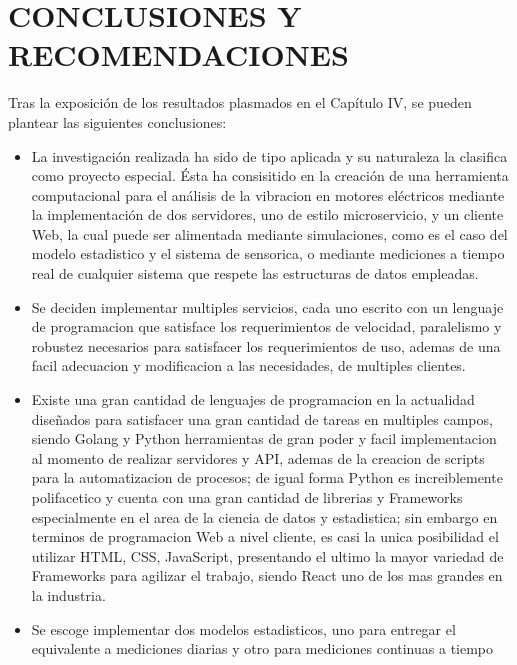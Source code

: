 \thispagestyle{empty}

\section{CONCLUSIONES Y RECOMENDACIONES}
Tras la exposición de los resultados plasmados en el Capítulo IV, se pueden
plantear las siguientes conclusiones:

\begin{itemize}
    \item La investigación realizada ha sido de tipo aplicada y su naturaleza
        la clasifica como proyecto especial. Ésta ha consisitido en la creación
        de una herramienta computacional para el análisis de la vibracion en motores
        eléctricos mediante la implementación de dos servidores, uno de estilo
        microservicio, y un cliente Web, la cual puede ser alimentada mediante
        simulaciones, como es el caso del modelo estadistico y el sistema de
        sensorica, o mediante mediciones a tiempo real de cualquier sistema
        que respete las estructuras de datos empleadas.
    \item Se deciden implementar multiples servicios, cada uno escrito con un
        lenguaje de programacion que satisface los requerimientos de velocidad,
        paralelismo y robustez necesarios para satisfacer los requerimientos de
        uso, ademas de una facil adecuacion y modificacion a las necesidades,
        de multiples clientes.
    \item Existe una gran cantidad de lenguajes de programacion en la actualidad
        diseñados para satisfacer una gran cantidad de tareas en multiples campos,
        siendo Golang y Python herramientas de gran poder y facil implementacion
        al momento de realizar servidores y API, ademas de la creacion de scripts
        para la automatizacion de procesos; de igual forma Python es increiblemente
        polifacetico y cuenta con una gran cantidad de librerias y Frameworks
        especialmente en el area de la ciencia de datos y estadistica; sin embargo
        en terminos de programacion Web a nivel cliente, es casi la unica
        posibilidad el utilizar HTML, CSS, JavaScript, presentando el ultimo la
        mayor variedad de Frameworks para agilizar el trabajo, siendo React uno
        de los mas grandes en la industria.
    \item Se escoge implementar dos modelos estadisticos, uno para entregar el
        equivalente a mediciones diarias y otro para mediciones continuas a tiempo

\end{itemize}
